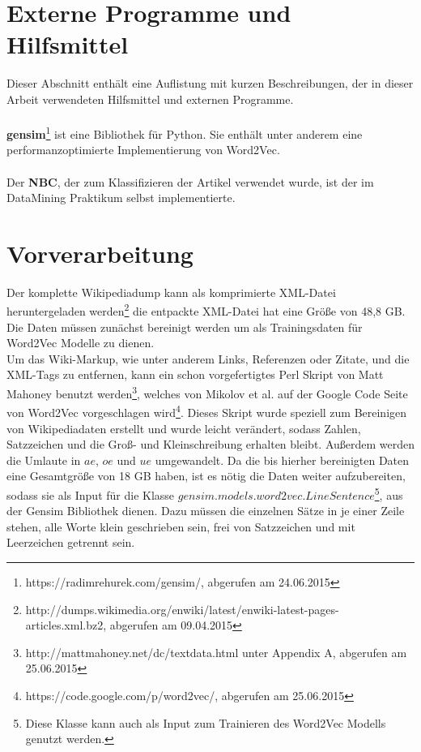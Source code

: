 \documentclass[12pt,a4paper]{report}
\begin{document}
	\section{Externe Programme und Hilfsmittel}
	Dieser Abschnitt enthält eine Auflistung mit kurzen Beschreibungen, der in dieser Arbeit verwendeten Hilfsmittel und externen Programme.\\
	\vspace{1em}\\	
	\textbf{gensim}\cite{rehurek_lrec}\footnote{https://radimrehurek.com/gensim/, abgerufen am 24.06.2015} ist eine Bibliothek für Python. Sie enthält unter anderem eine performanzoptimierte Implementierung von Word2Vec.\\ 
	\vspace{1em}\\
	Der \textbf{NBC}, der zum Klassifizieren der Artikel verwendet wurde, ist der im DataMining Praktikum selbst implementierte.
	\vspace{1em}\\
	
	\section{Vorverarbeitung}
	\label{sec:Vorverarbeitung}
	Der komplette Wikipediadump kann als komprimierte XML-Datei heruntergeladen werden\footnote{http://dumps.wikimedia.org/enwiki/latest/enwiki-latest-pages-articles.xml.bz2, abgerufen am 09.04.2015} die entpackte XML-Datei hat eine Größe von 48,8 GB. Die Daten müssen zunächst bereinigt werden um als Trainingsdaten für Word2Vec Modelle zu dienen.\\		
	Um das Wiki-Markup, wie unter anderem Links, Referenzen oder Zitate, und die XML-Tags zu entfernen, kann ein schon vorgefertigtes Perl Skript von Matt Mahoney benutzt werden\footnote{http://mattmahoney.net/dc/textdata.html unter Appendix A, abgerufen am 25.06.2015}, welches von Mikolov et al. auf der Google Code Seite von Word2Vec vorgeschlagen wird\footnote{https://code.google.com/p/word2vec/, abgerufen am 25.06.2015}. Dieses Skript wurde speziell zum Bereinigen von Wikipediadaten erstellt und wurde leicht verändert, sodass Zahlen, Satzzeichen und die Groß- und Kleinschreibung erhalten bleibt. Außerdem werden die Umlaute in $ae$, $oe$ und $ue$ umgewandelt. Da die bis hierher bereinigten Daten eine Gesamtgröße von 18 GB haben, ist es nötig die Daten weiter aufzubereiten, sodass sie als Input für die Klasse $gensim.models.word2vec.LineSentence$\footnote{Diese Klasse kann auch als Input zum Trainieren des Word2Vec Modells genutzt werden.}, aus der Gensim Bibliothek dienen. Dazu müssen die einzelnen Sätze in je einer Zeile stehen, alle Worte klein geschrieben sein, frei von Satzzeichen und mit Leerzeichen getrennt sein.\\
	
\end{document}
